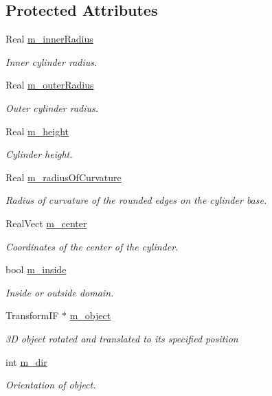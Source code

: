 \subsection*{Protected Attributes}
\begin{DoxyCompactItemize}
\item 
Real \hyperlink{classhollow__cylinder__if_ad9c34a10457a69839378556faedf6fe2}{m\+\_\+inner\+Radius}
\begin{DoxyCompactList}\small\item\em Inner cylinder radius. \end{DoxyCompactList}\item 
Real \hyperlink{classhollow__cylinder__if_a3971c8a329b24ffc355e34c513f7984c}{m\+\_\+outer\+Radius}
\begin{DoxyCompactList}\small\item\em Outer cylinder radius. \end{DoxyCompactList}\item 
Real \hyperlink{classhollow__cylinder__if_a25f10212eeb2ef13f33978393a3a0d23}{m\+\_\+height}
\begin{DoxyCompactList}\small\item\em Cylinder height. \end{DoxyCompactList}\item 
Real \hyperlink{classhollow__cylinder__if_a1c19d8a4dd90ad0b39610295d22472d4}{m\+\_\+radius\+Of\+Curvature}
\begin{DoxyCompactList}\small\item\em Radius of curvature of the rounded edges on the cylinder base. \end{DoxyCompactList}\item 
Real\+Vect \hyperlink{classhollow__cylinder__if_a66a7d95e14fec3ce48200c4e392cb34d}{m\+\_\+center}
\begin{DoxyCompactList}\small\item\em Coordinates of the center of the cylinder. \end{DoxyCompactList}\item 
bool \hyperlink{classhollow__cylinder__if_af9c34dac5f25bd52436bfbe7490a8e53}{m\+\_\+inside}
\begin{DoxyCompactList}\small\item\em Inside or outside domain. \end{DoxyCompactList}\item 
Transform\+IF $\ast$ \hyperlink{classhollow__cylinder__if_a96a4234945284cad647279fa30e8fb6c}{m\+\_\+object}
\begin{DoxyCompactList}\small\item\em 3D object rotated and translated to its specified position \end{DoxyCompactList}\item 
int \hyperlink{classhollow__cylinder__if_af3ca7b4fbb40dc0b0c4a8bd3d04ec954}{m\+\_\+dir}
\begin{DoxyCompactList}\small\item\em Orientation of object. \end{DoxyCompactList}\end{DoxyCompactItemize}
